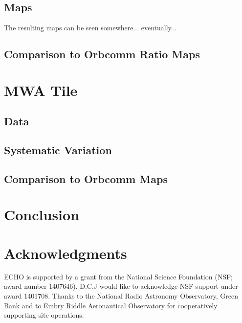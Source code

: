 \documentclass[preprint2]{aastex}
\begin{document}
\subsection{Maps}

The resulting maps can be seen somewhere... eventually...

\subsection{Comparison to Orbcomm Ratio Maps}
\section{MWA Tile}
\subsection{Data}
\subsection{Systematic Variation}
\subsection{Comparison to Orbcomm Maps}
\section{Conclusion}


\section{Acknowledgments}{

ECHO is supported by a grant from the National Science Foundation (NSF; award number 1407646). D.C.J would like to acknowledge NSF support  under award 1401708.
Thanks to the National Radio Astronomy Observatory, Green Bank and to Embry Riddle Aeronautical Observatory for cooperatively supporting site operations.
}




\end{document}
